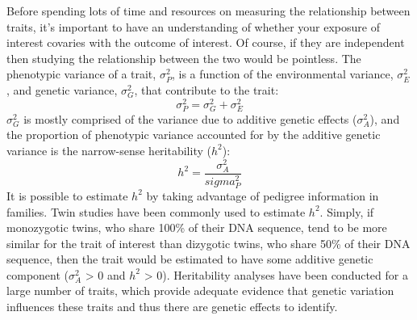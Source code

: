 \documentclass[11pt,twoside]{bristolthesis}
\begin{document}
Before spending lots of time and resources on measuring the relationship between traits, it's important to have an understanding of whether your exposure of interest covaries with the outcome of interest. Of course, if they are independent then studying the relationship between the two would be pointless. The phenotypic variance of a trait, \(\sigma^2_{P}\), is a function of the environmental variance, \(\sigma^2_{E}\), and genetic variance, \(\sigma^2_{G}\), that contribute to the trait:
\begin{equation}
  \sigma^2_{P} = \sigma^2_{G} + \sigma^2_{E}
  \label{eq:phenotypic-variance}
\end{equation}
\(\sigma^2_{G}\) is mostly comprised of the variance due to additive genetic effects (\(\sigma^2_{A}\)), and the proportion of phenotypic variance accounted for by the additive genetic variance is the narrow-sense heritability (\(h^2\)):
\begin{equation}
  h^2 = \frac{\sigma^2_{A}} {sigma^2_{P}}
  \label{eq:narrow-sense-heritability}
\end{equation}
It is possible to estimate \(h^2\) by taking advantage of pedigree information in families. Twin studies have been commonly used to estimate \(h^2\). Simply, if monozygotic twins, who share 100\% of their DNA sequence, tend to be more similar for the trait of interest than dizygotic twins, who share 50\% of their DNA sequence, then the trait would be estimated to have some additive genetic component (\(\sigma^2_{A}\) \textgreater{} 0 and \(h^2\) \textgreater{} 0).
Heritability analyses have been conducted for a large number of traits, which provide adequate evidence that genetic variation influences these traits and thus there are genetic effects to identify.
\end{document}
